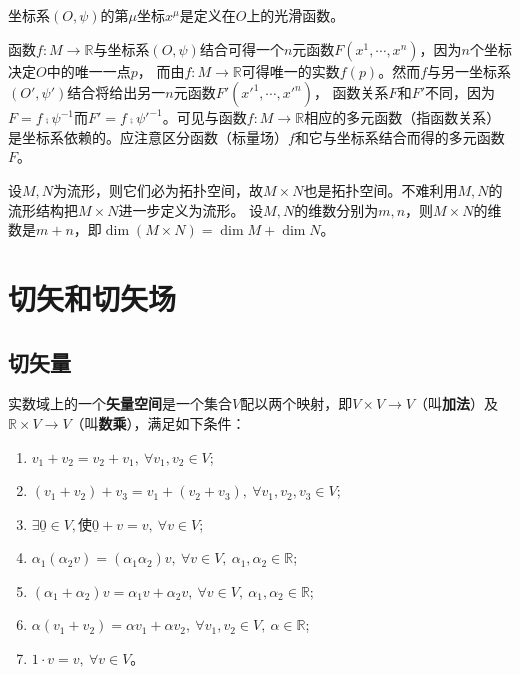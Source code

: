 \begin{example}
坐标系$(O, \psi)$的第$\mu$坐标$x^\mu$是定义在$O$上的光滑函数。
\end{example}

函数$f \colon M \to \mathbb{R}$与坐标系$(O, \psi)$结合可得一个$n$元函数$F(x^1, \cdots, x^n)$，因为$n$个坐标决定$O$中的唯一一点$p$，
而由$f \colon M \to \mathbb{R}$可得唯一的实数$f(p)$。然而$f$与另一坐标系$(O', \psi')$结合将给出另一$n$元函数$F'(x'^1, \cdots, x'^n)$，
函数关系$F$和$F'$不同，因为$F = f \comp \psi^{-1}$而$F' = f \comp \psi'^{-1}$。可见与函数$f \colon M \to \mathbb{R}$相应的多元函数（指函数关系）
是坐标系依赖的。应注意区分函数（标量场）$f$和它与坐标系结合而得的多元函数$F$。

设$M, N$为流形，则它们必为拓扑空间，故$M \times N$也是拓扑空间。不难利用$M, N$的流形结构把$M \times N$进一步定义为流形。
设$M, N$的维数分别为$m, n$，则$M \times N$的维数是$m + n$，即$\dim{(M \times N)} = \dim{M} + \dim{N}$。

\section{切矢和切矢场}

\subsection{切矢量}

\begin{definition}
实数域上的一个\textbf{矢量空间}是一个集合$V$配以两个映射，即$V \times V \to V$（叫\textbf{加法}）及$\mathbb{R} \times V \to V$（叫\textbf{数乘}），满足如下条件：
\begin{enumerate}[（a）]
\item $v_1 + v_2 = v_2 + v_1, ~ \forall v_1, v_2 \in V$;
\item $(v_1 + v_2) + v_3 = v_1 + (v_2 + v_3), ~ \forall v_1, v_2, v_3 \in V$;
\item $\exists \underline{0} \in V, \text{使} \underline{0} + v = v, ~ \forall v \in V$;
\item $\alpha_1(\alpha_2v) = (\alpha_1\alpha_2)v, ~ \forall v \in V, ~ \alpha_1, \alpha_2 \in \mathbb{R}$;
\item $(\alpha_1 + \alpha_2)v = \alpha_1v + \alpha_2v, ~ \forall v \in V, ~ \alpha_1, \alpha_2 \in \mathbb{R}$;
\item $\alpha(v_1 + v_2) = \alpha v_1 + \alpha v_2, ~ \forall v_1, v_2 \in V, ~ \alpha \in \mathbb{R}$;
\item $1 \cdot v = v, ~ \forall v \in V$。
\end{enumerate}
\end{definition}

